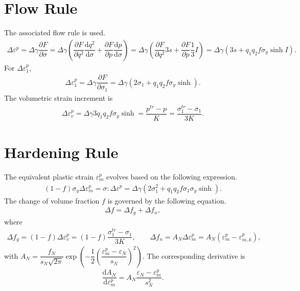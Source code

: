 \documentclass[10pt,fleqn,3p]{elsarticle}
\newcommand*{\md}[1]{\mathrm{d}#1}
\newcommand*{\ddfrac}[2]{\dfrac{\md#1}{\md#2}}
\newcommand*{\pfrac}[2]{\dfrac{\partial#1}{\partial#2}}
\begin{document}
\section{Flow Rule}
The associated flow rule is used.
\begin{gather*}
\Delta\varepsilon^p=\Delta\gamma\pfrac{F}{\sigma}=\Delta\gamma\left(\pfrac{F}{q^2}\ddfrac{q^2}{\sigma}+\pfrac{F}{p}\ddfrac{p}{\sigma}\right)=\Delta\gamma\left(\pfrac{F}{q^2}3s+\pfrac{F}{p}\dfrac{1}{3}I\right)=\Delta\gamma\left(3s+q_1q_2f\sigma_y\sinh{}I\right).
\end{gather*}
For $\Delta\varepsilon^p_1$,
\begin{gather*}
\Delta\varepsilon^p_1=\Delta\gamma\pfrac{F}{\sigma_1}=\Delta\gamma\left(2\sigma_1+q_1q_2f\sigma_y\sinh\right).
\end{gather*}
The volumetric strain increment is
\begin{gather}
\Delta\varepsilon^p_v=\Delta\gamma3q_1q_2f\sigma_y\sinh=\dfrac{p^{tr}-p}{K}=\dfrac{\sigma_1^{tr}-\sigma_1}{3K}.
\end{gather}
\section{Hardening Rule}
The equivalent plastic strain $\varepsilon^p_m$ evolves based on the following expression.
\begin{gather*}
\left(1-f\right)\sigma_y\Delta\varepsilon^p_m=\sigma:\Delta\varepsilon^p=\Delta\gamma\left(2\sigma_1^2+q_1q_2f\sigma_1\sigma_y\sinh\right).
\end{gather*}
The change of volume fraction $f$ is governed by the following equation.
\begin{gather*}
\Delta{}f=\Delta{}f_g+\Delta{}f_n,
\end{gather*}
where
\begin{gather*}
\Delta{}f_g=\left(1-f\right)\Delta\varepsilon^p_v=\left(1-f\right)\dfrac{\sigma_1^{tr}-\sigma_1}{3K},\qquad
\Delta{}f_n=A_N\Delta\varepsilon^p_m=A_N\left(\varepsilon^p_m-\varepsilon^p_{m,k}\right),
\end{gather*}
with $A_N=\dfrac{f_N}{s_N\sqrt{2\pi}}\exp\left(-\dfrac{1}{2}\left(\dfrac{\varepsilon^p_m-\varepsilon_N}{s_N}\right)^2\right)$. The corresponding derivative is
\begin{gather*}
\ddfrac{A_N}{\varepsilon^p_m}=A_N\dfrac{\varepsilon_N-\varepsilon^p_m}{s_N^2}.
\end{gather*}
\end{document}
